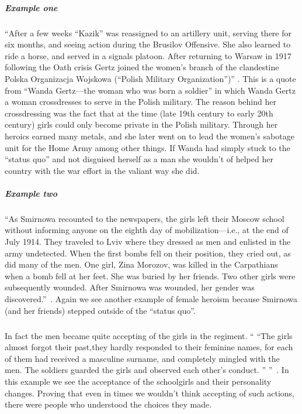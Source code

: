 \subparagraph{Example one}
``After a few weeks ``Kazik'' was reassigned to an artillery unit, serving there
for six months, and seeing action during the Brusilov Offensive. She also
learned to ride a horse, and served in a signals platoon. After returning to
Warsaw in 1917 following the Oath crisis Gertz joined the women's branch of the
clandestine Polska Organizacja Wojskowa (``Polish Military Organization'')''
\cite{TWBS}. This is a quote from ``Wanda Gertz---the woman who was born a
soldier'' in which Wanda Gertz a woman crossdresses to serve in the Polish
military. The reason behind her crossdressing was the fact that at the
time (late 19th century to early 20th century) girls could only become private in
the Polish military. Through her heroics earned many metals, and she later went
on to lead the women's sabotage unit for the Home Army among other things. If
Wanda had simply stuck to the ``status quo'' and not disguised herself as a man
she wouldn't of helped her country with the war effort in the valiant way she
did.
\par

\newpage
\subparagraph{Example two}
``As Smirnowa recounted to the newspapers, the girls left their Moscow school
without informing anyone on the eighth day of mobilization---i.e., at the end of
July 1914. They traveled to Lviv where they dressed as men and enlisted in the
army undetected. When the first bombs fell on their position, they cried out,
as did many of the men. One girl, Zina Morozov, was killed in the Carpathians
when a bomb fell at her feet. She was buried by her friends. Two other girls
were subsequently wounded. After Smirnowa was wounded, her gender was
discovered.''~\cite[p.~365-67]{YGFRF}. Again we see another example of female
heroism because Smirnowa (and her friends) stepped outside of the ``status quo''.
\par

\subparagraph{}
In fact the men became quite accepting of the girls in the regiment.
`` ``The girls almost forgot their past,they hardly responded to their feminine
names, for each of them had received a masculine surname, and completely mingled
with the men. The soldiers guarded the girls and observed each other's conduct.
'' ''~\cite[p.~366]{YGFRF}. In this example we see the acceptance of the
schoolgirls and their personality changes. Proving that even in times we
wouldn't think accepting of such actions, there were people who understood the
choices they made.
\par

